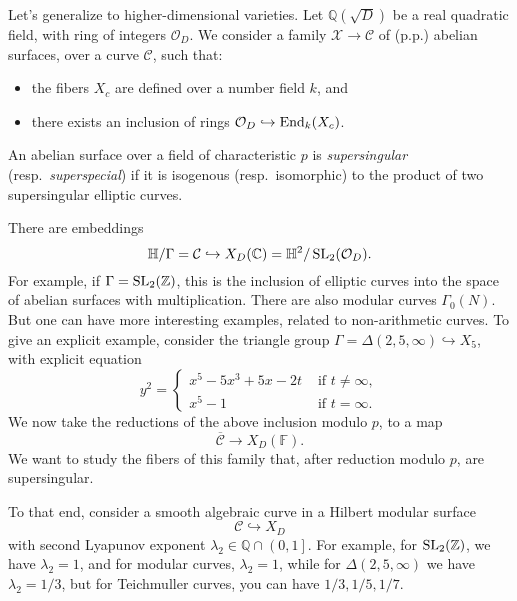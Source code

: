 \documentclass[reqno]{amsart} 
\begin{document}
Let's generalize to higher-dimensional varieties.  Let $\mathbb{Q}(\sqrt{D})$ be a real quadratic field, with ring of integers $\mathcal{O}_D$.  We consider a family $\mathcal{X} \rightarrow \mathcal{C}$ of (p.p.) abelian surfaces, over a curve $\mathcal{C}$, such that:
\begin{itemize}
\item the fibers $X_c$ are defined over a number field $k$, and
\item there exists an inclusion of rings $\mathcal{O}_D \hookrightarrow \operatorname{End}_k(X_c)$.
\end{itemize}
An abelian surface over a field of characteristic $p$ is \emph{supersingular} (resp.\ \emph{superspecial}) if it is isogenous (resp.\ isomorphic) to the product of two supersingular elliptic curves.

There are embeddings
\begin{equation*}
  \mathbb{H} / \Gamma = \mathcal{C} \hookrightarrow X_D(\mathbb{C}) = \mathbb{H}^2 / \operatorname{SL}_2(\mathcal{O}_D).
\end{equation*}
For example, if $\Gamma = \operatorname{SL}_2(\mathbb{Z})$, this is the inclusion of elliptic curves into the space of abelian surfaces with multiplication.  There are also modular curves $\Gamma_0(N)$.  But one can have more interesting examples, related to non-arithmetic curves.  To give an explicit example, consider the triangle group $\Gamma = \Delta(2, 5, \infty) \hookrightarrow X_5$, with explicit equation
\begin{equation*}
  y^2 =
  \begin{cases}
    x^5 - 5 x^3 + 5 x    
    - 2 t
    & \text{ if } t \neq \infty, \\
    x^5 - 1    & \text{ if } t = \infty.
  \end{cases}
\end{equation*}
We now take the reductions of the above inclusion modulo $p$, to a map
\begin{equation*}
  \overline{\mathcal{C}} \rightarrow X_D(\mathbb{F}). 
\end{equation*}
We want to study the fibers of this family that, after reduction modulo $p$, are supersingular.

To that end, consider a smooth algebraic curve in a Hilbert modular surface
\begin{equation*}
  \mathcal{C} \hookrightarrow X_D
\end{equation*}
with second Lyapunov exponent $\lambda_2 \in \mathbb{Q} \cap \left(0,1\right]$.  For example, for $\operatorname{SL}_2(\mathbb{Z})$, we have $\lambda_2 = 1$, and for modular curves, $\lambda_2 = 1$, while for
$\Delta(2, 5, \infty)$ we have $\lambda_2 = 1/3$, but for Teichmuller curves, you can have $1/3, 1/5, 1/7$.
\end{document}
